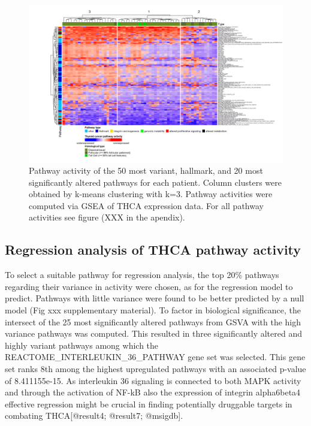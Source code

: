 \documentclass[
]{article}
\begin{document}
\begin{figure}

{\centering \includegraphics[width=1\linewidth]{figures/THCA GSEA Heatmap fertig top 50} 

}

\caption{Pathway activity of the 50 most variant, hallmark, and 20 most significantly altered pathways for each patient. Column clusters were obtained by k-means clustering with k=3. Pathway activities were computed via GSEA of THCA expression data. For all pathway activities see figure (XXX in the apendix).}\label{fig:THCAhmGSEA}
\end{figure}

\hypertarget{regression-analysis-of-thca-pathway-activity}{%
\subsection{Regression analysis of THCA pathway
activity}\label{regression-analysis-of-thca-pathway-activity}}

To select a suitable pathway for regression analysis, the top 20\%
pathways regarding their variance in activity were chosen, as for the
regression model to predict. Pathways with little variance were found to
be better predicted by a null model (Fig xxx supplementary material). To
factor in biological significance, the intersect of the 25 most
significantly altered pathways from GSVA with the high variance pathways
was computed. This resulted in three significantly altered and highly
variant pathways among which the REACTOME\_INTERLEUKIN\_36\_PATHWAY gene
set was selected. This gene set ranks 8th among the highest upregulated
pathways with an associated p-value of 8.411155e-15. As interleukin 36
signaling is connected to both MAPK activity and through the activation
of NF-kB also the expression of integrin alpha6beta4 effective
regression might be crucial in finding potentially druggable targets in
combating THCA{[}@result4; @result7; @msigdb{]}.
\end{document}
